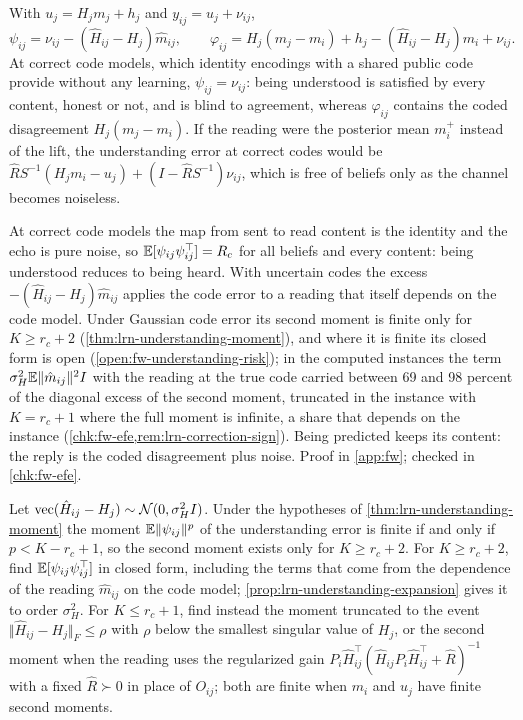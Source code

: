\begin{proposition}\label{prop:fw-understood-predicted}
With $u_j=H_jm_j+h_j$ and $y_{ij}=u_j+\nu_{ij}$,
\begin{equation}\label{eq:fw-two-errors}
\psi_{ij}=\nu_{ij}-(\hat H_{ij}-H_j)\hat m_{ij},\qquad\varphi_{ij}=H_j(m_j-m_i)+h_j-(\hat H_{ij}-H_j)m_i+\nu_{ij}.
\end{equation}
At correct code models, which identity encodings with a shared public code provide without any learning, $\psi_{ij}=\nu_{ij}$: being understood is satisfied by every content, honest or not, and is blind to agreement, whereas $\varphi_{ij}$ contains the coded disagreement $H_j(m_j-m_i)$. If the reading were the posterior mean $m_i^+$ instead of the lift, the understanding error at correct codes would be $\hat RS^{-1}(H_jm_i-u_j)+(I-\hat RS^{-1})\nu_{ij}$, which is free of beliefs only as the channel becomes noiseless.
\end{proposition}

At correct code models the map from sent to read content is the identity and the echo is pure noise, so $\mathbb{E}[\psi_{ij}\psi_{ij}^\top]=R_c$ for all beliefs and every content: being understood reduces to being heard. With uncertain codes the excess $-(\hat H_{ij}-H_j)\hat m_{ij}$ applies the code error to a reading that itself depends on the code model. Under Gaussian code error its second moment is finite only for $K\ge r_c+2$ (\cref{thm:lrn-understanding-moment}), and where it is finite its closed form is open (\cref{open:fw-understanding-risk}); in the computed instances the term $\sigma_H^2\mathbb{E}\Vert\hat m_{ij}\Vert^2I$ with the reading at the true code carried between 69 and 98 percent of the diagonal excess of the second moment, truncated in the instance with $K=r_c+1$ where the full moment is infinite, a share that depends on the instance (\cref{chk:fw-efe,rem:lrn-correction-sign}). Being predicted keeps its content: the reply is the coded disagreement plus noise. Proof in \cref{app:fw}; checked in \cref{chk:fw-efe}.

\begin{openproblem}\label{open:fw-understanding-risk}
Let $\mathrm{vec}(\hat H_{ij}-H_j)\sim\mathcal{N}(0,\sigma_H^2I)$. Under the hypotheses of \cref{thm:lrn-understanding-moment} the moment $\mathbb{E}\Vert\psi_{ij}\Vert^p$ of the understanding error is finite if and only if $p<K-r_c+1$, so the second moment exists only for $K\ge r_c+2$. For $K\ge r_c+2$, find $\mathbb{E}[\psi_{ij}\psi_{ij}^\top]$ in closed form, including the terms that come from the dependence of the reading $\hat m_{ij}$ on the code model; \cref{prop:lrn-understanding-expansion} gives it to order $\sigma_H^2$. For $K\le r_c+1$, find instead the moment truncated to the event $\Vert\hat H_{ij}-H_j\Vert_F\le\rho$ with $\rho$ below the smallest singular value of $H_j$, or the second moment when the reading uses the regularized gain $P_i\hat H_{ij}^\top(\hat H_{ij}P_i\hat H_{ij}^\top+\hat R)^{-1}$ with a fixed $\hat R\succ0$ in place of $O_{ij}$; both are finite when $m_i$ and $u_j$ have finite second moments.
\end{openproblem}

